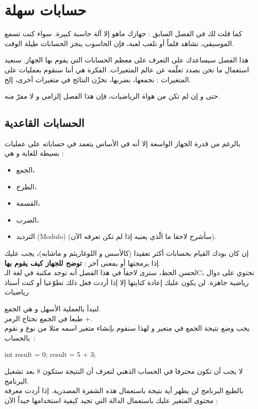 \chapter{حسابات سهلة}

كما قلت لك في الفصل السابق : جهازك ماهو إلا آلة حاسبة كبيرة. سواء كنت تسمع الموسيقى، تشاهد فلماً أو تلعب لعبة، فإن الحاسوب ينجز الحسابات طيلة الوقت.

هذا الفصل سيساعدك على التعرف على معظم الحسابات التي يقوم بها الجهاز. سنعيد استعمال ما نحن بصدد تعلّمه عن عالم المتغيرات. الفكرة هي أننا سنقوم بعمليات على المتغيرات : نجمعها، نضربها، نخزّن النتائج في متغيرات أخرى، إلخ.

حتى و إن لم تكن من هواة الرياضيات، فإن هذا الفصل إلزامي و لا مفرّ منه.

\section{الحسابات القاعدية}

بالرغم من قدرة الجهاز الواسعة إلا أنه في الأساس يتعمد في حساباته على عمليات بسيطة للغاية و هي :

\begin{itemize}
  \item الجمع،
  \item الطرح،
  \item القسمة،
  \item الضرب،
  \item الترديد
(\textenglish{Modulo})
(سأشرح لاحقا ما الّذي يعنيه إذا لم تكن تعرفه الآن).
\end{itemize}

إن كان بودك القيام بحسابات أكثر تعقيدا (كالأسس و اللوغاريثم و ماشابه)، يجب عليك إذا برمجتها أو بمعنى آخر :
\textbf{توضح للجهاز كيف يقوم بها}.\\
لحسن الحظ، سترى لاحقاً في هذا الفصل أنه توجد مكتبة في لغة الـ\textenglish{C}،
تحتوي على دوال رياضية جاهزة. لن يكون عليك إعادة كتابتها إلا إذا أردت فعل ذلك تطوّعيا أو كنت أستاذ رياضيات.

لنبدأ بالعملية الأسهل و هي الجمع.\\
طبعا في الجمع نحتاج الرمز +.\\
يجب وضع نتيجة الجمع في متغير و لهذا سنقوم بإنشاء متغير اسمه مثلا
من نوع
و نقوم بالحساب~:

\begin{Csource}
  int result = 0;
  result = 5 + 3;
\end{Csource}

لا يجب أن تكون محترفا في الحساب الذهني لتعرف أن النتيجة ستكون 8 بعد تشغيل البرنامج.\\
بالطبع البرنامج لن يظهر أية نتيجة باستعمال هذه الشفرة المصدرية. إذا أردت معرفة محتوى المتغير
عليك باستعمال الدالة
التي تجيد كيفية استخدامها جيداً الآن :


